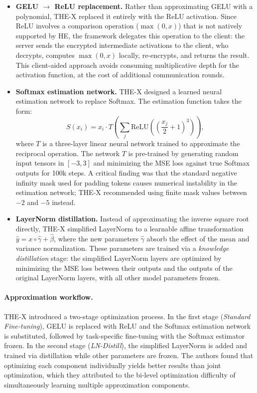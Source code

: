 \begin{itemize}
    \item \textbf{GELU $\to$ ReLU replacement.} Rather than approximating GELU with a polynomial, THE-X replaced it entirely with the ReLU activation. Since ReLU involves a comparison operation ($\max(0, x)$) that is not natively supported by HE, the framework delegates this operation to the client: the server sends the encrypted intermediate activations to the client, who decrypts, computes $\max(0, x)$ locally, re-encrypts, and returns the result. This client-aided approach avoids consuming multiplicative depth for the activation function, at the cost of additional communication rounds.

    \item \textbf{Softmax estimation network.} THE-X designed a learned neural estimation network to replace Softmax. The estimation function takes the form:
    \begin{equation}
        S(x_i) = x_i \cdot T\!\left(\sum_j \mathrm{ReLU}\!\left(\left(\frac{x_j}{2} + 1\right)^3\right)\right),
        \label{eq:thex_softmax}
    \end{equation}
    where $T$ is a three-layer linear neural network trained to approximate the reciprocal operation. The network $T$ is pre-trained by generating random input tensors in $[-3, 3]$ and minimizing the MSE loss against true Softmax outputs for 100k steps. A critical finding was that the standard negative infinity mask used for padding tokens causes numerical instability in the estimation network; THE-X recommended using finite mask values between $-2$ and $-5$ instead.

    \item \textbf{LayerNorm distillation.} Instead of approximating the inverse square root directly, THE-X simplified LayerNorm to a learnable affine transformation $\hat{y} = x \circ \hat{\gamma} + \hat{\beta}$, where the new parameters $\hat{\gamma}$ absorb the effect of the mean and variance normalization. These parameters are trained via a \emph{knowledge distillation} stage: the simplified LayerNorm layers are optimized by minimizing the MSE loss between their outputs and the outputs of the original LayerNorm layers, with all other model parameters frozen.
\end{itemize}

\paragraph{Approximation workflow.} THE-X introduced a two-stage optimization process. In the first stage (\emph{Standard Fine-tuning}), GELU is replaced with ReLU and the Softmax estimation network is substituted, followed by task-specific fine-tuning with the Softmax estimator frozen. In the second stage (\emph{LN-Distill}), the simplified LayerNorm is added and trained via distillation while other parameters are frozen. The authors found that optimizing each component individually yields better results than joint optimization, which they attributed to the bi-level optimization difficulty of simultaneously learning multiple approximation components.

